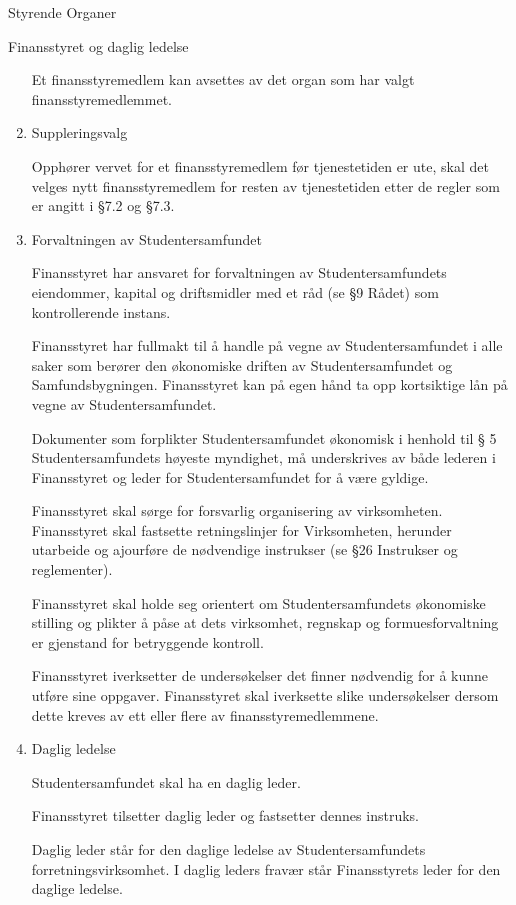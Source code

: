 \begin{lovkapittel}{Styrende Organer}
\begin{lovparagraf}{Finansstyret og daglig ledelse}
\begin{enumerate}
    Et finansstyremedlem kan avsettes av det organ som har valgt finansstyremedlemmet.
    
    \item Suppleringsvalg
    
    Opphører vervet for et finansstyremedlem før tjenestetiden er ute, skal det velges nytt finansstyremedlem for
    resten av tjenestetiden etter de regler som er angitt i §7.2 og §7.3.
    
    \item Forvaltningen av Studentersamfundet
    
    Finansstyret har ansvaret for forvaltningen av Studentersamfundets eiendommer, kapital og driftsmidler med
    et råd (se §9 Rådet) som kontrollerende instans.
    
    Finansstyret har fullmakt til å handle på vegne av Studentersamfundet i alle saker som berører den
    økonomiske driften av Studentersamfundet og Samfundsbygningen. Finansstyret kan på egen hånd ta opp
    kortsiktige lån på vegne av Studentersamfundet.
    
    Dokumenter som forplikter Studentersamfundet økonomisk i henhold til § 5 Studentersamfundets høyeste
    myndighet, må underskrives av både lederen i Finansstyret og leder for Studentersamfundet for å være gyldige.
    
    Finansstyret skal sørge for forsvarlig organisering av virksomheten. Finansstyret skal fastsette retningslinjer
    for Virksomheten, herunder utarbeide og ajourføre de nødvendige instrukser (se §26 Instrukser og reglementer).
      
    Finansstyret skal holde seg orientert om Studentersamfundets økonomiske stilling og plikter å påse at dets
    virksomhet, regnskap og formuesforvaltning er gjenstand for betryggende kontroll.
    
    Finansstyret iverksetter de undersøkelser det finner nødvendig for å kunne utføre sine oppgaver. Finansstyret
    skal iverksette slike undersøkelser dersom dette kreves av ett eller flere av finansstyremedlemmene.
    
    \item Daglig ledelse
    
    Studentersamfundet skal ha en daglig leder.
    
    Finansstyret tilsetter daglig leder og fastsetter dennes instruks.
    
    Daglig leder står for den daglige ledelse av Studentersamfundets forretningsvirksomhet. I daglig leders
    fravær står Finansstyrets leder for den daglige ledelse.
    

\end{enumerate}
\end{lovparagraf}
\end{lovkapittel}
